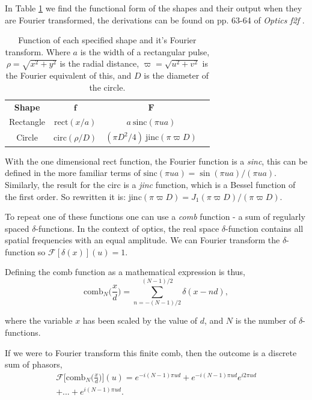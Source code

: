 \documentclass[twocolumn]{revtex4}
\begin{document}
In Table \ref{fshapes} we find the functional form of the shapes and their output when they are Fourier transformed, the derivations can be found on pp. 63-64 of \textit{Optics f2f} \cite{of2f}. 
\begin{table}[h!]
\centering
\begin{tabular}{c@{\hskip 20pt}c@{\hskip 20pt}c@{\hskip 10pt}c} 
 \hline
 \textbf{Shape} 	& \textbf{$\boldsymbol{f}$} 		& \textbf{$\boldsymbol{F}$} \\ [1ex] 
 Rectangle 	& $\text{rect}(x/a)$ 				& $a\: \text{sinc}(\pi ua)$ \\ 
 Circle 		& $\text{circ}(\rho/D)$ 			& $(\pi D^2/4)\: \text{jinc}(\pi \varpi D)$ \\
 \hline
\end{tabular}
\caption{Function of each specified shape and it's Fourier transform. Where $a$ is the width of a rectangular pulse, $\rho=\sqrt{x^2+y^2}$ is the radial distance, $\varpi=\sqrt{u^2+v^2}$ is the Fourier equivalent of this, and $D$ is the diameter of the circle.}
\label{fshapes}
\end{table}
\setlength{\belowcaptionskip}{-10pt}

With the one dimensional rect function, the Fourier function is a \textit{sinc}, this can be defined in the more familiar terms of $\text{sinc}(\pi ua)=\sin (\pi ua)/(\pi ua)$. Similarly, the result for the circ is a \textit{jinc} function, which is a Bessel function of the first order. So rewritten it is: $\text{jinc}(\pi \varpi D)=J_1 (\pi \varpi D)/(\pi \varpi D)$.

To repeat one of these functions one can use a \textit{comb} function - a sum of regularly spaced $\delta$-functions. In the context of optics, the real space $\delta$-function contains all spatial frequencies with an equal amplitude. We can Fourier transform the $\delta$-function so $\mathcal{F}[\delta(x)](u)=1$.

Defining the comb function as a mathematical expression is thus,
\begin{equation}
\text{comb}_N \Big(\frac{x}{d}\Big) = \sum_{n=-(N-1)/2}^{(N-1)/2} \delta(x-nd),
\end{equation}

where the variable $x$ has been scaled by the value of $d$, and $N$ is the number of $\delta$-functions.

If we were to Fourier transform this finite comb, then the outcome is a discrete sum of phasors, 
\begin{multline}
\mathcal{F}\Big[\text{comb}_N\Big(\frac{x}{d}\Big)\Big](u)=e^{-i(N-1)\pi ud} + e^{-i(N-1)\pi ud}e^{i2\pi ud}\\+...+e^{i(N-1)\pi ud}.
\end{multline}
\end{document}
